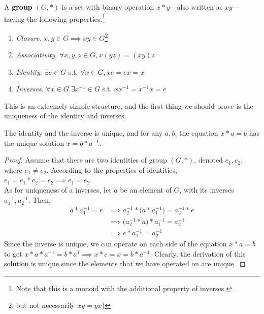   \begin{definition}[Group]
    A \textbf{group} $(G, \ast)$ is a set with binary operation $x \ast y$---also written as $xy$---having the following properties.\footnote{Note that this is a monoid with the additional property of inverses.}
    \begin{enumerate}
      \item \textit{Closure}. $x, y \in G \implies xy \in G$\footnote{but not necessarily $xy  = yx$)}
      \item \textit{Associativity}. $\forall x, y, z \in G, x(yz) = (xy)z$
      \item \textit{Identity}. $\exists e \in G$ s.t. $\forall x \in G, xe = ex = x$
      \item \textit{Inverses}. $\forall x \in G \; \exists x^{-1} \in G$ s.t. $x x^{-1} = x^{-1} x = e$
    \end{enumerate}
  \end{definition} 

  This is an extremely simple structure, and the first thing we should prove is the uniqueness of the identity and inverses. 

  \begin{lemma}
    The identity and the inverse is unique, and for any $a, b$, the equation $x*a = b$ has the unique solution $x = b* a^{-1}$.
  \end{lemma}
  \begin{proof}
     Assume that there are two identities of group $(G,*)$, denoted $e_{1}, e_{2}$, where $e_{1} \neq e_{2}$. According to the properties of identities, $e_{1} = e_{1} * e_{2} = e_{2} \implies e_{1} = e_{2}$. \\
    As for uniqueness of a inverses, let $a$ be an element of $G$, with its inverses $a_{1}^{-1}, a_{2}^{-1}$. Then, 
    \begin{align*}
      a * a_{1}^{-1} = e & \implies a_{2}^{-1} * \Big(a * a_{1}^{-1} \Big)= a_{2}^{-1} * e \\
       & \implies \Big(a_{2}^{-1} * a \Big) * a_{1}^{-1} = a_{2}^{-1} \\
       & \implies e * a_{1}^{-1} = a_{2}^{-1}
    \end{align*}
    Since the inverse is unique, we can operate on each side of the equation $x*a = b$ to get $x*a*a^{-1} = b*a^{1} \implies x * e = x = b*a^{-1}$. Clearly, the derivation of this solution is unique since the elements that we have operated on are unique.
  \end{proof} 
  
